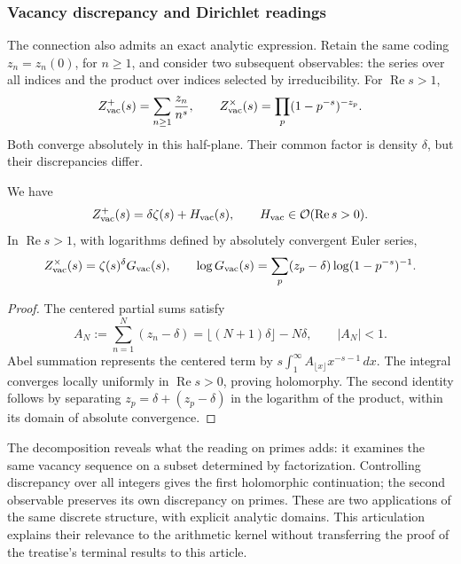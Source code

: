 \subsubsection{Vacancy discrepancy and Dirichlet readings}

The connection also admits an exact analytic expression. Retain the
same coding \(z_n=z_n(0)\), for \(n\geq1\), and consider two
subsequent observables: the series over all indices and the product
over indices selected by irreducibility. For \(\operatorname{Re}s>1\),
\[
 Z_{\rm vac}^{+}(s)=\sum_{n\geq1}\frac{z_n}{n^s},\qquad
 Z_{\rm vac}^{\times}(s)=\prod_p(1-p^{-s})^{-z_p}.
\]
Both converge absolutely in this half-plane. Their common factor is
density \(\delta\), but their discrepancies differ.

\begin{proposition}
We have
\[
 Z_{\rm vac}^{+}(s)=\delta\zeta(s)+H_{\rm vac}(s),
 \qquad H_{\rm vac}\in\mathcal O(\operatorname{Re}s>0).
\]
In \(\operatorname{Re}s>1\), with logarithms defined by absolutely
convergent Euler series,
\[
 Z_{\rm vac}^{\times}(s)=\zeta(s)^\delta G_{\rm vac}(s),\qquad
 \log G_{\rm vac}(s)=
 \sum_p(z_p-\delta)\log(1-p^{-s})^{-1}.
\]
\end{proposition}
\begin{proof}
The centered partial sums satisfy
\[
 A_N:=\sum_{n=1}^N(z_n-\delta)
 =\lfloor(N+1)\delta\rfloor-N\delta,\qquad |A_N|<1.
\]
Abel summation represents the centered term by
\(s\int_1^\infty A_{\lfloor x\rfloor}x^{-s-1}\,dx\).
The integral converges locally uniformly in \(\operatorname{Re}s>0\),
proving holomorphy. The second identity follows by separating
\(z_p=\delta+(z_p-\delta)\) in the logarithm of the product,
within its domain of absolute convergence.
\end{proof}

The decomposition reveals what the reading on primes adds: it examines
the same vacancy sequence on a subset determined by factorization.
Controlling discrepancy over all integers gives the first holomorphic
continuation; the second observable preserves its own discrepancy on
primes. These are two applications of the same discrete structure,
with explicit analytic domains. This articulation explains their
relevance to the arithmetic kernel without transferring the proof
of the treatise's terminal results to this article.
